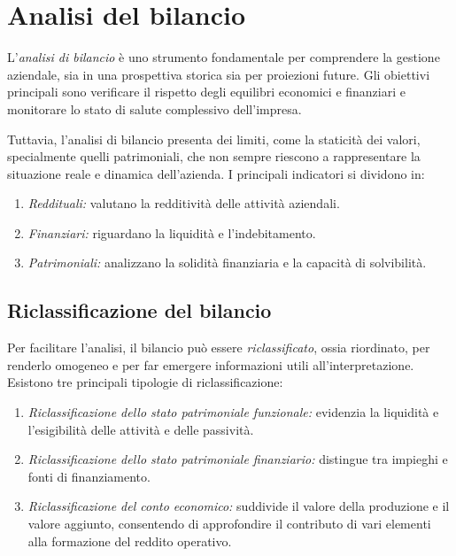 \section{Analisi del bilancio}
L’\textit{analisi di bilancio} è uno strumento fondamentale per comprendere la gestione aziendale, sia in una prospettiva storica sia per proiezioni future. Gli obiettivi principali sono verificare il rispetto degli equilibri economici e finanziari e monitorare lo stato di salute complessivo dell’impresa.

Tuttavia, l’analisi di bilancio presenta dei limiti, come la staticità dei valori, specialmente quelli patrimoniali, che non sempre riescono a rappresentare la situazione reale e dinamica dell’azienda. I principali indicatori si dividono in:
\begin{enumerate}
    \item \textit{Reddituali:} valutano la redditività delle attività aziendali.
    \item \textit{Finanziari:} riguardano la liquidità e l’indebitamento.
    \item \textit{Patrimoniali:} analizzano la solidità finanziaria e la capacità di solvibilità.
\end{enumerate}

\subsection{Riclassificazione del bilancio}
Per facilitare l’analisi, il bilancio può essere \textit{riclassificato}, ossia riordinato, per renderlo omogeneo e per far emergere informazioni utili all’interpretazione. Esistono tre principali tipologie di riclassificazione:
\begin{enumerate}
    \item \textit{Riclassificazione dello stato patrimoniale funzionale:} evidenzia la liquidità e l’esigibilità delle attività e delle passività.
    \item \textit{Riclassificazione dello stato patrimoniale finanziario:} distingue tra impieghi e fonti di finanziamento.
    \item \textit{Riclassificazione del conto economico:} suddivide il valore della produzione e il valore aggiunto, consentendo di approfondire il contributo di vari elementi alla formazione del reddito operativo.
\end{enumerate}

